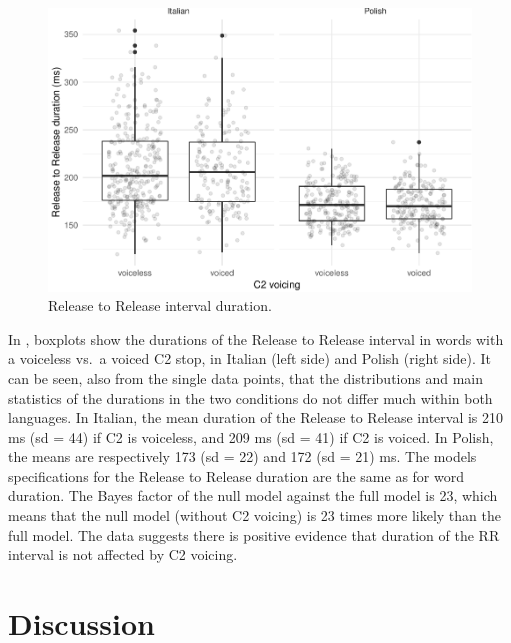 \documentclass[preprint]{JASAnew}
\begin{document}
\begin{figure}
\includegraphics{2018-jasa_files/figure-latex/rr-plot-1} \caption{Release to Release interval duration.}\label{f:rr-plot}
\end{figure}

In , boxplots show the durations of the Release to
Release interval in words with a voiceless vs.~a voiced C2 stop, in
Italian (left side) and Polish (right side). It can be seen, also from
the single data points, that the distributions and main statistics of
the durations in the two conditions do not differ much within both
languages. In Italian, the mean duration of the Release to Release
interval is 210 ms (sd = 44) if C2 is voiceless, and 209 ms (sd = 41) if
C2 is voiced. In Polish, the means are respectively 173 (sd = 22) and
172 (sd = 21) ms. The models specifications for the Release to Release
duration are the same as for word duration. The Bayes factor of the null
model against the full model is 23, which means that the null model
(without C2 voicing) is 23 times more likely than the full model. The
data suggests there is positive evidence that duration of the RR
interval is not affected by C2 voicing.

\hypertarget{discussion}{%
\section{Discussion}\label{discussion}}
\end{document}
